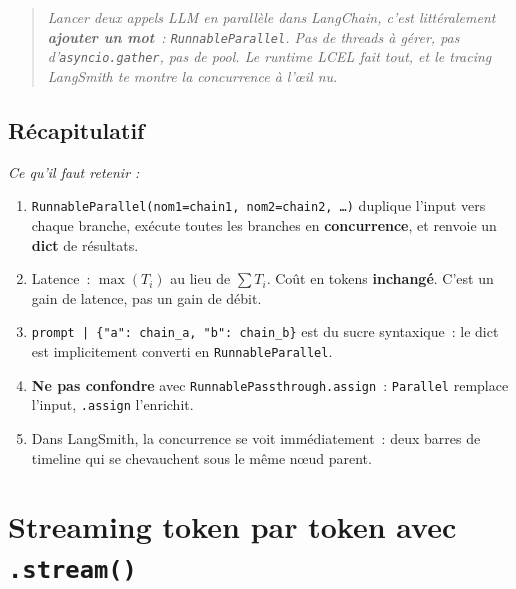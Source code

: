 \documentclass[11pt,a4paper]{article}
\begin{document}
\begin{quote}\itshape
Lancer deux appels LLM en parallèle dans LangChain, c'est littéralement
\textbf{ajouter un mot}~: \texttt{RunnableParallel}. Pas de threads à
gérer, pas d'\texttt{asyncio.gather}, pas de pool. Le runtime LCEL fait
tout, et le tracing LangSmith te montre la concurrence à l'œil nu.
\end{quote}

\subsection*{Récapitulatif}
{\itshape\sloppy
\textit{Ce qu'il faut retenir :}
\begin{enumerate}[leftmargin=*]
  \item \texttt{RunnableParallel(nom1=chain1, nom2=chain2, \dots)} duplique
        l'input vers chaque branche, exécute toutes les branches en
        \textbf{concurrence}, et renvoie un \textbf{dict} de résultats.
  \item Latence~: $\max(T_i)$ au lieu de $\sum T_i$. Coût en tokens
        \textbf{inchangé}. C'est un gain de latence, pas un gain de débit.
  \item \texttt{prompt | \{"a": chain\_a, "b": chain\_b\}} est du sucre
        syntaxique~: le dict est implicitement converti en
        \texttt{RunnableParallel}.
  \item \textbf{Ne pas confondre} avec \texttt{RunnablePassthrough.assign}~:
        \texttt{Parallel} remplace l'input, \texttt{.assign} l'enrichit.
  \item Dans LangSmith, la concurrence se voit immédiatement~: deux barres
        de timeline qui se chevauchent sous le même nœud parent.
\end{enumerate}
\par}

\section{Streaming token par token avec \texttt{.stream()}}
\end{document}
